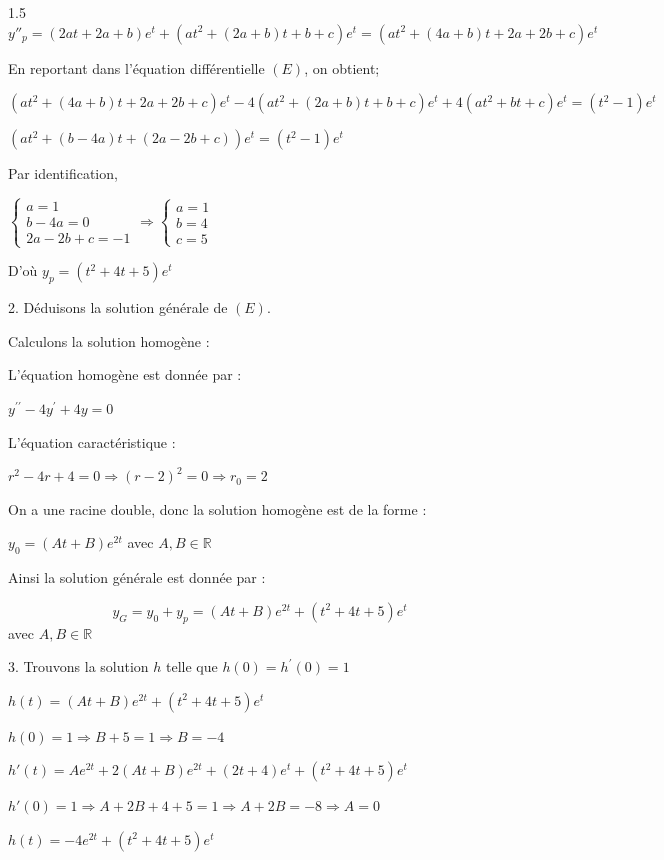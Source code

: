 \documentclass[12pt]{article}
\begin{document}
\begin{spacing}{1.5}
$y''_p=(2at+2a+b)e^t+(at^2+(2a+b)t+b+c)e^t=(at^2+(4a+b)t+2a+2b+c)e^t$

En reportant dans l'équation différentielle $(E)$, on obtient;

$(at^2+(4a+b)t+2a+2b+c)e^t-4(at^2+(2a+b)t+b+c)e^t+4(at^2+bt+c)e^t=(t^2 - 1)e^t$

$(at^2+(b-4a)t+(2a-2b+c))e^t=(t^2 - 1)e^t$

Par identification,

$\begin{cases}
a=1\\
b-4a=0\\
2a-2b+c=-1
\end{cases}\Rightarrow \begin{cases}
a=1\\
b=4\\
c=5
\end{cases}$

D'où $y_p=(t^2+4t+5)e^t$

2. Déduisons la solution générale de $(E)$.

Calculons la solution homogène :

L'équation homogène est donnée par :

$y^{\prime\prime}-4y^{\prime} + 4y =0$

L'équation caractéristique :

$r^2-4r+4=0\Rightarrow (r-2)^2=0\Rightarrow r_0=2$

On a une racine double, donc la solution homogène est de la forme :

$y_0=(At+B)e^{2t}$ avec $A,B\in \mathbb{R}$

Ainsi la solution générale est donnée par :

\[
y_G=y_0+y_p=(At+B)e^{2t}+(t^2+4t+5)e^t\] avec $A,B\in \mathbb{R}$


3. Trouvons la solution $h$ telle que $h(0)=h^{\prime}(0)=1$

$h(t)=(At+B)e^{2t}+(t^2+4t+5)e^t$

$h(0)=1\Rightarrow B+5=1\Rightarrow B=-4$

$h'(t)=Ae^{2t}+2(At+B)e^{2t}+(2t+4)e^t+(t^2+4t+5)e^t$

$h'(0)=1\Rightarrow A+2B+4+5=1\Rightarrow A+2B=-8\Rightarrow A=0$

$h(t)=-4e^{2t}+(t^2+4t+5)e^t$

\medskip

\end{spacing}
\end{document}
